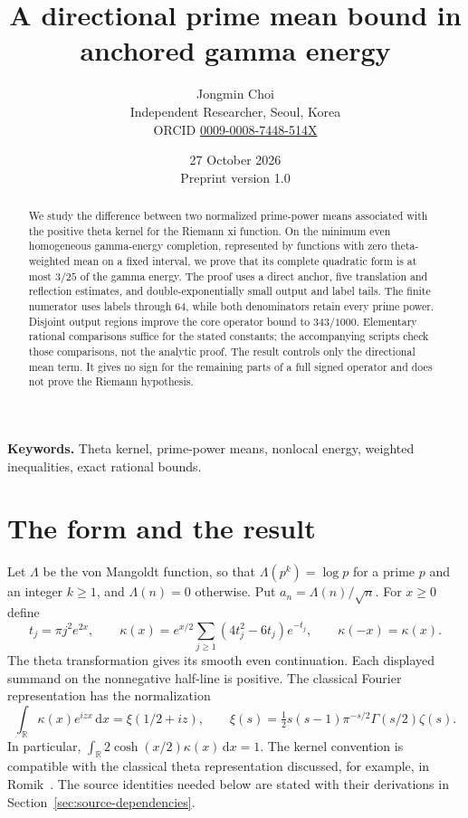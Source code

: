 \documentclass[11pt]{article}
\title{A directional prime mean bound in anchored gamma energy}
\author{Jongmin Choi\\[3pt]\small Independent Researcher, Seoul, Korea\\\small ORCID \href{https://orcid.org/0009-0008-7448-514X}{0009-0008-7448-514X}}
\date{27 October 2026\\\small Preprint version 1.0}
\theoremstyle{remark}\newtheorem{remark}[theorem]{Remark}
\newcommand{\R}{\mathbb R}
\newcommand{\dd}{\,\mathrm d}
\numberwithin{equation}{section}
\begin{document}
\maketitle
\begin{abstract}
We study the difference between two normalized prime-power means associated with the positive theta kernel for the Riemann xi function. On the minimum even homogeneous gamma-energy completion, represented by functions with zero theta-weighted mean on a fixed interval, we prove that its complete quadratic form is at most $3/25$ of the gamma energy. The proof uses a direct anchor, five translation and reflection estimates, and double-exponentially small output and label tails. The finite numerator uses labels through $64$, while both denominators retain every prime power. Disjoint output regions improve the core operator bound to $343/1000$. Elementary rational comparisons suffice for the stated constants; the accompanying scripts check those comparisons, not the analytic proof. The result controls only the directional mean term. It gives no sign for the remaining parts of a full signed operator and does not prove the Riemann hypothesis.
\end{abstract}
\noindent\textbf{Keywords.} Theta kernel, prime-power means, nonlocal energy, weighted inequalities, exact rational bounds.

\section{The form and the result}\label{sec:setting}
Let $\Lambda$ be the von Mangoldt function, so that $\Lambda(p^k)=\log p$ for a prime $p$ and an integer $k\ge1$, and $\Lambda(n)=0$ otherwise. Put $a_n=\Lambda(n)/\sqrt n$. For $x\ge0$ define
\begin{equation}\label{eq:kappa}
 t_j=\pi j^2e^{2x},\qquad
 \kappa(x)=e^{x/2}\sum_{j\ge1}(4t_j^2-6t_j)e^{-t_j},
 \qquad \kappa(-x)=\kappa(x).
\end{equation}
The theta transformation gives its smooth even continuation. Each displayed summand on the nonnegative half-line is positive. The classical Fourier representation has the normalization
\begin{equation}\label{eq:xi}
 \int_\R\kappa(x)e^{izx}\dd x=\xi(1/2+iz),\qquad
 \xi(s)=\tfrac12s(s-1)\pi^{-s/2}\Gamma(s/2)\zeta(s).
\end{equation}
In particular, $\int_\R2\cosh(x/2)\kappa(x)\dd x=1$. The kernel convention is compatible with the classical theta representation discussed, for example, in Romik~\cite{Romik2021}. The source identities needed below are stated with their derivations in Section~\ref{sec:source-dependencies}.
\end{document}
